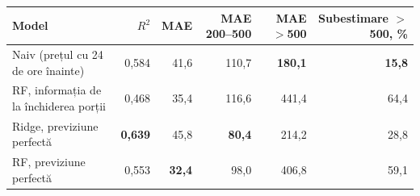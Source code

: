 \begin{tabular}{lrrrrr}
\toprule
Model & $R^2$ & MAE & MAE 200--500 & MAE $>$500 & Subestimare $>$500, \% \\
\midrule
Naiv (prețul cu 24 de ore înainte) & 0,584 & 41,6 & 110,7 & \textbf{180,1} & \textbf{15,8} \\
RF, informația de la închiderea porții & 0,468 & 35,4 & 116,6 & 441,4 & 64,4 \\
Ridge, previziune perfectă & \textbf{0,639} & 45,8 & \textbf{80,4} & 214,2 & 28,8 \\
RF, previziune perfectă & 0,553 & \textbf{32,4} & 98,0 & 406,8 & 59,1 \\
\bottomrule
\end{tabular}
